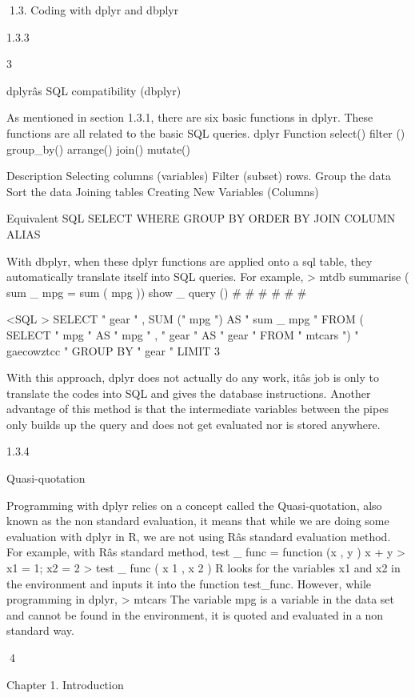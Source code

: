 1.3. Coding with dplyr and dbplyr

1.3.3

3

dplyrâs SQL compatibility (dbplyr)

As mentioned in section 1.3.1, there are six basic functions in dplyr. These functions
are all related to the basic SQL queries.
dplyr Function
select()
filter ()
group_by()
arrange()
join()
mutate()

Description
Selecting columns (variables)
Filter (subset) rows.
Group the data
Sort the data
Joining tables
Creating New Variables (Columns)

Equivalent SQL
SELECT
WHERE
GROUP BY
ORDER BY
JOIN
COLUMN ALIAS

With dbplyr, when these dplyr functions are applied onto a sql table, they automatically translate itself into SQL queries. For example,
> mtdb %
summarise ( sum _ mpg = sum ( mpg )) %
show _ query ()
#
#
#
#
#
#

<SQL >
SELECT " gear " , SUM (" mpg ") AS " sum _ mpg "
FROM ( SELECT " mpg " AS " mpg " , " gear " AS " gear "
FROM " mtcars ") " gaecowztcc "
GROUP BY " gear "
LIMIT 3

With this approach, dplyr does not actually do any work, itâs job is only to translate
the codes into SQL and gives the database instructions. Another advantage of this
method is that the intermediate variables between the pipes only builds up the query
and does not get evaluated nor is stored anywhere.

1.3.4

Quasi-quotation

Programming with dplyr relies on a concept called the Quasi-quotation, also known
as the non standard evaluation, it means that while we are doing some evaluation
with dplyr in R, we are not using Râs standard evaluation method. For example,
with Râs standard method,
test _ func = function (x , y ){
x + y
}
> x1 = 1; x2 = 2
> test _ func ( x 1 , x 2 )
R looks for the variables x1 and x2 in the environment and inputs it into the function
test_func.
However, while programming in dplyr,
> mtcars %
The variable mpg is a variable in the data set and cannot be found in the environment,
it is quoted and evaluated in a non standard way.

4

Chapter 1. Introduction

